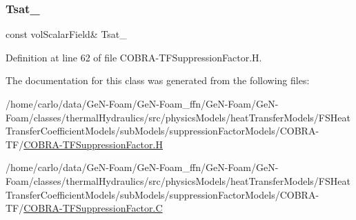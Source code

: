 \subsubsection{\texorpdfstring{Tsat\+\_\+}{Tsat\_}}
{\footnotesize\ttfamily const vol\+Scalar\+Field\& Tsat\+\_\+\hspace{0.3cm}{\ttfamily [protected]}}



Definition at line 62 of file C\+O\+B\+R\+A-\/\+T\+F\+Suppression\+Factor.\+H.



The documentation for this class was generated from the following files\+:\begin{DoxyCompactItemize}
\item 
/home/carlo/data/\+Ge\+N-\/\+Foam/\+Ge\+N-\/\+Foam\+\_\+ffn/\+Ge\+N-\/\+Foam/\+Ge\+N-\/\+Foam/classes/thermal\+Hydraulics/src/physics\+Models/heat\+Transfer\+Models/\+F\+S\+Heat\+Transfer\+Coefficient\+Models/sub\+Models/suppression\+Factor\+Models/\+C\+O\+B\+R\+A-\/\+T\+F/\hyperlink{COBRA-TFSuppressionFactor_8H}{C\+O\+B\+R\+A-\/\+T\+F\+Suppression\+Factor.\+H}\item 
/home/carlo/data/\+Ge\+N-\/\+Foam/\+Ge\+N-\/\+Foam\+\_\+ffn/\+Ge\+N-\/\+Foam/\+Ge\+N-\/\+Foam/classes/thermal\+Hydraulics/src/physics\+Models/heat\+Transfer\+Models/\+F\+S\+Heat\+Transfer\+Coefficient\+Models/sub\+Models/suppression\+Factor\+Models/\+C\+O\+B\+R\+A-\/\+T\+F/\hyperlink{COBRA-TFSuppressionFactor_8C}{C\+O\+B\+R\+A-\/\+T\+F\+Suppression\+Factor.\+C}\end{DoxyCompactItemize}
